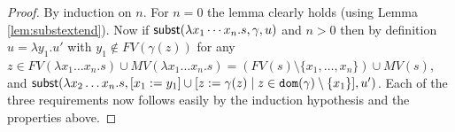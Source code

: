 \documentclass{lmcs}
\theoremstyle{theorem}\newtheorem{theorem}{Theorem}
\theoremstyle{theorem}\newtheorem{lemma}[theorem]{Lemma}
\theoremstyle{theorem}\newtheorem{corollary}[theorem]{Corollary}
\theoremstyle{definition}\newtheorem{definition}[theorem]{Definition}
\theoremstyle{definition}\newtheorem{example}[theorem]{Example}
\newcommand{\V}{\mathcal{V}}
\newcommand{\M}{\mathcal{M}}
\newcommand{\FV}{\mathit{FV}}
\newcommand{\FMV}{\mathit{MV}}
\newcommand{\domain}{\mathtt{dom}}
\newcommand{\avar}{x}
\newcommand{\bvar}{y}
\newcommand{\cvar}{z}
\newcommand{\Avar}{X}
\newcommand{\abs}[2]{\lambda #1.#2}
\begin{document}
\begin{proof}
By induction on $n$.  For $n = 0$ the lemma clearly holds (using Lemma
\ref{lem:substextend}).
Now if $\subrel{\abs{\avar_1 \cdots \avar_n}{s},\gamma,u}$ and $n > 0$ then
by definition $u = \abs{\bvar_1}{u'}$ with $\bvar_1 \notin \FV(\gamma(\cvar))$
for any $\cvar \in \FV(\abs{\avar_1 \dots \avar_n}{s}) \cup \FMV(\abs{\avar_1
\dots \avar_n}{s}) = (\FV(s) \setminus \{\avar_1,\dots,\avar_n\}) \cup \FMV(s)$,
and $\subrel{\abs{\avar_2 \dots \avar_n}{s}, [\avar_1:=\bvar_1] \cup [\cvar:=
\gamma(\cvar) \mid \cvar \in \domain(\gamma) \setminus \{\avar_1\}],u'}$.
Each of the three requirements now follows easily by the induction hypothesis and the properties above.

\end{proof}
\end{document}
